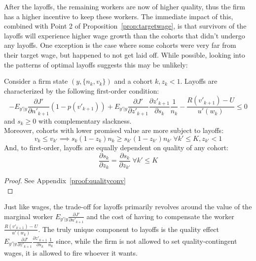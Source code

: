 After the layoffs, the remaining workers are now of higher quality, thus the firm has a higher incentive to keep these workers. The immediate impact of this, combined with Point 2 of Proposition~\ref{prop:targetwage}, is that survivors of the layoffs will experience higher wage growth than the cohorts that didn't undergo any layoffs. One exception is the case where some cohorts were very far from their target wage, but happened to not get laid off. While possible, looking into the patterns of optimal layoffs suggests this may be unlikely:
\begin{proposition} \label{prop:qualityconv}
 Consider a firm state $(y,\{n_k,v_k\})$ and a cohort $k, z_k<1$. Layoffs are characterized by the following first-order condition:
  \begin{equation}
    -E_{y'|y}\frac{\partial J'}{\partial n'_{k+1}}(1-p(v'_{k+1}))+E_{y'|y}\frac{\partial J'}{\partial z'_{k+1}}\frac{\partial z'_{k+1}}{\partial s_k}\frac{1}{n_k} - \frac{R(v'_{k+1})-U}{u'(w_k)}\leq 0
  \end{equation}
  and $s_k \geq 0$ with complementary slackness. \\
Moreover, cohorts with lower promised value are more subject to layoffs: 
    \[ v_k \leq v_{k'} \implies s_k(1- z_k) n_k \geq s_{k'}(1-z_{k'})n_{k'} \: \forall k'\leq K, z_{k'}<1\]
And, to first-order, layoffs are equally dependent on quality of any cohort:
    \[ \frac{\partial s_k}{\partial z_k} = \frac{\partial s_k}{\partial z_{k'}} \: \forall k'\leq K\]
\end{proposition}
\begin{proof}
  See Appendix~\ref{proof:qualityconv} \\

\end{proof}
Just like wages, the trade-off for layoffs primarily revolves around the value of the marginal worker $E_{y'|y}\frac{\partial J'}{\partial n'_{k+1}}$ and the cost of having to compensate the worker $\frac{R(v'_{k+1})-U}{u'(w_k)}$. The truly unique component to layoffs is the quality effect $E_{y'|y}\frac{\partial J'}{\partial z'_{k+1}}\frac{\partial z'_{k+1}}{\partial s_k}\frac{1}{n_k}$ since, while the firm is not allowed to set quality-contingent wages, it is allowed to fire whoever it wants. \\
